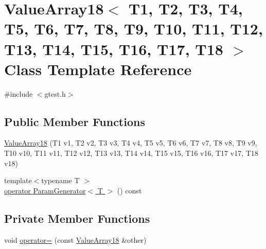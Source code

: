 \hypertarget{classtesting_1_1internal_1_1ValueArray18}{\section{\-Value\-Array18$<$ \-T1, \-T2, \-T3, \-T4, \-T5, \-T6, \-T7, \-T8, \-T9, \-T10, \-T11, \-T12, \-T13, \-T14, \-T15, \-T16, \-T17, \-T18 $>$ \-Class \-Template \-Reference}
\label{d3/d7b/classtesting_1_1internal_1_1ValueArray18}
}


{\ttfamily \#include $<$gtest.\-h$>$}

\subsection*{\-Public \-Member \-Functions}
\begin{DoxyCompactItemize}
\item 
\hyperlink{classtesting_1_1internal_1_1ValueArray18_a2e71a963bb7ad32b1fcaedbc95a83629}{\-Value\-Array18} (\-T1 v1, \-T2 v2, \-T3 v3, \-T4 v4, \-T5 v5, \-T6 v6, \-T7 v7, \-T8 v8, \-T9 v9, \-T10 v10, \-T11 v11, \-T12 v12, \-T13 v13, \-T14 v14, \-T15 v15, \-T16 v16, \-T17 v17, \-T18 v18)
\item 
{\footnotesize template$<$typename T $>$ }\\\hyperlink{classtesting_1_1internal_1_1ValueArray18_a08ef46fa12c9dd8ef6fc630baeea89b7}{operator Param\-Generator$<$ T $>$} () const 
\end{DoxyCompactItemize}
\subsection*{\-Private \-Member \-Functions}
\begin{DoxyCompactItemize}
\item 
void \hyperlink{classtesting_1_1internal_1_1ValueArray18_ab2284547216ab889716a2782290e8448}{operator=} (const \hyperlink{classtesting_1_1internal_1_1ValueArray18}{\-Value\-Array18} \&other)
\end{DoxyCompactItemize}
